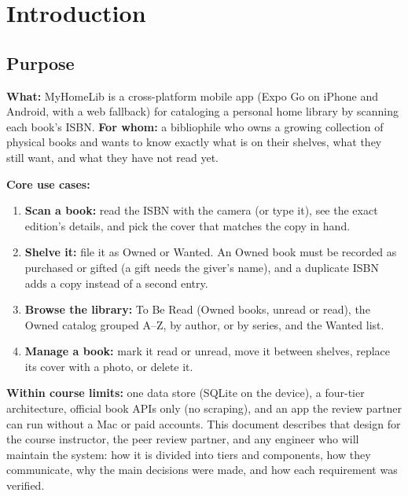 \documentclass[12pt]{article}
\begin{document}
\newpage

\tableofcontents

\newpage

\section{Introduction}

\subsection{Purpose}

\textbf{What:} MyHomeLib is a cross-platform mobile app (Expo Go on iPhone and Android, with a web fallback) for cataloging a personal home library by scanning each book's ISBN. \textbf{For whom:} a bibliophile who owns a growing collection of physical books and wants to know exactly what is on their shelves, what they still want, and what they have not read yet.

\textbf{Core use cases:}
\begin{enumerate}[label=\textbf{UC\arabic*}, leftmargin=3.2em]
    \item \textbf{Scan a book:} read the ISBN with the camera (or type it), see the exact edition's details, and pick the cover that matches the copy in hand.
    \item \textbf{Shelve it:} file it as Owned or Wanted. An Owned book must be recorded as purchased or gifted (a gift needs the giver's name), and a duplicate ISBN adds a copy instead of a second entry.
    \item \textbf{Browse the library:} To Be Read (Owned books, unread or read), the Owned catalog grouped A--Z, by author, or by series, and the Wanted list.
    \item \textbf{Manage a book:} mark it read or unread, move it between shelves, replace its cover with a photo, or delete it.
\end{enumerate}

\textbf{Within course limits:} one data store (SQLite on the device), a four-tier architecture, official book APIs only (no scraping), and an app the review partner can run without a Mac or paid accounts. This document describes that design for the course instructor, the peer review partner, and any engineer who will maintain the system: how it is divided into tiers and components, how they communicate, why the main decisions were made, and how each requirement was verified.
\end{document}
